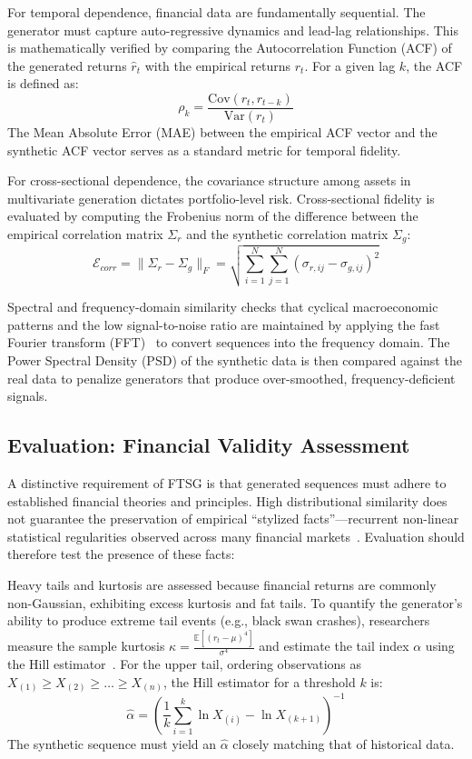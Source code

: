 \documentclass[11pt,a4paper]{article}
\begin{document}
For temporal dependence, financial data are fundamentally sequential. The generator must capture auto-regressive dynamics and lead-lag relationships. This is mathematically verified by comparing the Autocorrelation Function (ACF) of the generated returns $\hat{r}_t$ with the empirical returns $r_t$. For a given lag $k$, the ACF is defined as:
    \begin{equation}
        \rho_k = \frac{\text{Cov}(r_t, r_{t-k})}{\text{Var}(r_t)}
    \end{equation}
The Mean Absolute Error (MAE) between the empirical ACF vector and the synthetic ACF vector serves as a standard metric for temporal fidelity.

For cross-sectional dependence, the covariance structure among assets in multivariate generation dictates portfolio-level risk. Cross-sectional fidelity is evaluated by computing the Frobenius norm of the difference between the empirical correlation matrix $\Sigma_r$ and the synthetic correlation matrix $\Sigma_g$:
    \begin{equation}
        \mathcal{E}_{corr} = \|\Sigma_r - \Sigma_g\|_F = \sqrt{\sum_{i=1}^N \sum_{j=1}^N (\sigma_{r, ij} - \sigma_{g, ij})^2}
    \end{equation}

Spectral and frequency-domain similarity checks that cyclical macroeconomic patterns and the low signal-to-noise ratio are maintained by applying the fast Fourier transform (FFT)~\citep{cooley1965algorithm} to convert sequences into the frequency domain. The Power Spectral Density (PSD) of the synthetic data is then compared against the real data to penalize generators that produce over-smoothed, frequency-deficient signals.

\subsection{Evaluation: Financial Validity Assessment}
A distinctive requirement of FTSG is that generated sequences must adhere to established financial theories and principles. High distributional similarity does not guarantee the preservation of empirical ``stylized facts''—recurrent non-linear statistical regularities observed across many financial markets~\citep{cont2001empirical}. Evaluation should therefore test the presence of these facts:

Heavy tails and kurtosis are assessed because financial returns are commonly non-Gaussian, exhibiting excess kurtosis and fat tails. To quantify the generator's ability to produce extreme tail events (e.g., black swan crashes), researchers measure the sample kurtosis $\kappa = \frac{\mathbb{E}[(r_t - \mu)^4]}{\sigma^4}$ and estimate the tail index $\alpha$ using the Hill estimator~\citep{hill1975simple}. For the upper tail, ordering observations as $X_{(1)} \ge X_{(2)} \ge \dots \ge X_{(n)}$, the Hill estimator for a threshold $k$ is:
    \begin{equation}
        \hat{\alpha} = \left( \frac{1}{k} \sum_{i=1}^k \ln X_{(i)} - \ln X_{(k+1)} \right)^{-1}
    \end{equation}
The synthetic sequence must yield an $\hat{\alpha}$ closely matching that of historical data.
\end{document}
